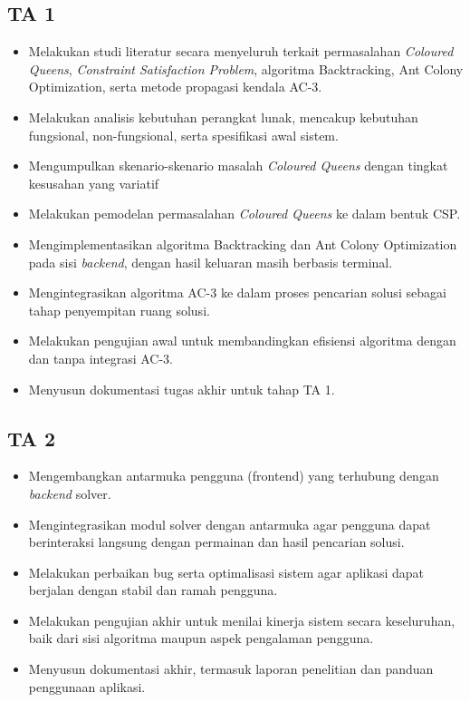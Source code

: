 \documentclass[12pt,a4paper]{article}
\begin{document}
	\subsection*{TA 1}
	\begin{itemize}
		\item Melakukan studi literatur secara menyeluruh terkait permasalahan \textit{Coloured Queens}, \textit{Constraint Satisfaction Problem}, algoritma Backtracking, Ant Colony Optimization, serta metode propagasi kendala AC-3.
		
		\item Melakukan analisis kebutuhan perangkat lunak, mencakup kebutuhan fungsional, non-fungsional, serta spesifikasi awal sistem.
		
		\item Mengumpulkan skenario-skenario masalah \textit{Coloured Queens} dengan tingkat kesusahan yang variatif
		
		\item Melakukan pemodelan permasalahan \textit{Coloured Queens} ke dalam bentuk CSP.
		
		\item Mengimplementasikan algoritma Backtracking dan Ant Colony Optimization pada sisi \textit{backend}, dengan hasil keluaran masih berbasis terminal.
		
		\item Mengintegrasikan algoritma AC-3 ke dalam proses pencarian solusi sebagai tahap penyempitan ruang solusi.
		
		\item Melakukan pengujian awal untuk membandingkan efisiensi algoritma dengan dan tanpa integrasi AC-3.
		
		\item Menyusun dokumentasi tugas akhir untuk tahap TA 1.
	\end{itemize}
	
	\subsection*{TA 2}
	\begin{itemize}
		\item Mengembangkan antarmuka pengguna (frontend) yang terhubung dengan \textit{backend} solver.
		
		\item Mengintegrasikan modul solver dengan antarmuka agar pengguna dapat berinteraksi langsung dengan permainan dan hasil pencarian solusi.
		
		\item Melakukan perbaikan bug serta optimalisasi sistem agar aplikasi dapat berjalan dengan stabil dan ramah pengguna.
		
		\item Melakukan pengujian akhir untuk menilai kinerja sistem secara keseluruhan, baik dari sisi algoritma maupun aspek pengalaman pengguna.
		
		\item Menyusun dokumentasi akhir, termasuk laporan penelitian dan panduan penggunaan aplikasi.
	\end{itemize}
	
\end{document}
